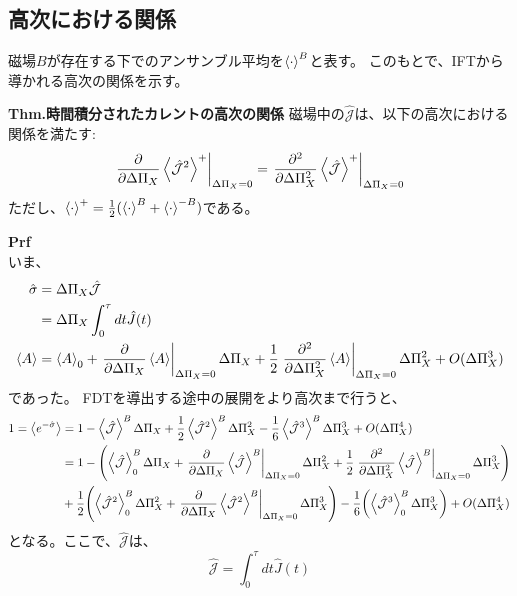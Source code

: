 \documentclass[a4paper,11pt]{jsarticle}
\begin{document}
\subsection{高次における関係}
磁場$B$が存在する下でのアンサンブル平均を$\ev{\cdot}^B$と表す。
このもとで、IFTから導かれる高次の関係を示す。
\begin{itembox}[l]{\textbf{Thm.時間積分されたカレントの高次の関係}}
    磁場中の$\hat{\mathcal{J}}$は、以下の高次における関係を満たす:
    \begin{align}
        \left.\pdv{\Delta \Pi_X} \ev{\hat{\mathcal{J}}^2}^+\right|_{\Delta \Pi_X = 0} = \left.\pdv[2]{\Delta \Pi_X} \ev{\hat{\mathcal{J}}}^+\right|_{\Delta \Pi_X = 0}
    \end{align}
    ただし、$\ev{\cdot}^+ = \frac{1}{2}(\ev{\cdot}^B + \ev{\cdot}^{-B})$である。
\end{itembox}
\textbf{Prf}\\
いま、
\begin{align}
    \hat{\sigma} &= \Delta \Pi_X \hat{\mathcal{J}}\\
    &= \Delta \Pi_X \int_{0}^{\tau} dt \hat{J}(t)\\
    \ev{A} &= \ev{A}_0 + \left.\pdv{\Delta \Pi_X} \ev{A}\right|_{\Delta \Pi_X = 0} \Delta \Pi_X + \frac{1}{2}\left.\pdv[2]{\Delta \Pi_X} \ev{A}\right|_{\Delta \Pi_X = 0} \Delta \Pi_X ^2 + O(\Delta \Pi_X ^3)
\end{align}
であった。
FDTを導出する途中の展開をより高次まで行うと、
\begin{align}
    1=\ev{e^{-\hat{\sigma}}}&= 1-\ev{\hat{\mathcal{J}}}^B \Delta \Pi_X + \frac{1}{2}\ev{\hat{\mathcal{J}}^2}^B \Delta \Pi_X ^2- \frac{1}{6}\ev{\hat{\mathcal{J}}^3}^B \Delta \Pi_X ^3 + O(\Delta \Pi_X ^4)\\
    &=1-\qty(\ev{\hat{\mathcal{J}}}^B_0 \Delta \Pi_X + \left.\pdv{\Delta \Pi_X} \ev{\hat{\mathcal{J}}}^B \right|_{\Delta \Pi_X = 0} \Delta \Pi_X ^2 + \frac{1}{2}\left.\pdv[2]{\Delta \Pi_X} \ev{\hat{\mathcal{J}}}^B \right|_{\Delta \Pi_X = 0} \Delta \Pi_X ^3 )\\
    &+ \frac{1}{2}\qty(\ev{\hat{\mathcal{J}}^2}^B_0 \Delta \Pi_X ^2 + \left.\pdv{\Delta \Pi_X} \ev{\hat{\mathcal{J}}^2}^B\right|_{\Delta \Pi_X = 0} \Delta \Pi_X ^3)- \frac{1}{6}\qty(\ev{\hat{\mathcal{J}}^3}^B_0 \Delta \Pi_X ^3) + O(\Delta \Pi_X ^4)
\end{align}
となる。ここで、$\hat{\mathcal{J}}$は、
\begin{equation}
    \hat{\mathcal{J}} = \int_{0}^{\tau} dt \hat{J}(t)
\end{equation}
\end{document}
